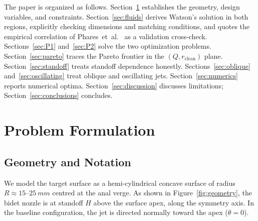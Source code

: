 \documentclass[aps,prfluids,reprint,amsmath,amssymb,floatfix]{revtex4-2}
\begin{document}
The paper is organized as follows. Section~\ref{sec:problem} establishes
the geometry, design variables, and constraints. Section~\ref{sec:fluids}
derives Watson's solution in both regions, explicitly checking dimensions
and matching conditions, and quotes the empirical correlation of
Phares~et~al.~\citep{Phares2000} as a validation cross-check.
Sections~\ref{sec:P1} and~\ref{sec:P2} solve the two optimization problems.
Section~\ref{sec:pareto} traces the Pareto frontier in the $(Q, r_\mathrm{clean})$
plane. Section~\ref{sec:standoff} treats standoff dependence honestly.
Sections~\ref{sec:oblique} and~\ref{sec:oscillating} treat oblique and
oscillating jets. Section~\ref{sec:numerics} reports numerical optima.
Section~\ref{sec:discussion} discusses limitations; Section~\ref{sec:conclusions}
concludes.

\section{Problem Formulation}
\label{sec:problem}

\subsection{Geometry and Notation}

We model the target surface as a hemi-cylindrical concave surface of
radius $R \approx 15$--$\SI{25}{mm}$ centred at the anal verge. As shown
in Figure~\ref{fig:geometry}, the bidet nozzle is at standoff $H$ above
the surface apex, along the symmetry axis. In the baseline configuration,
the jet is directed normally toward the apex ($\theta = 0$).
\end{document}
